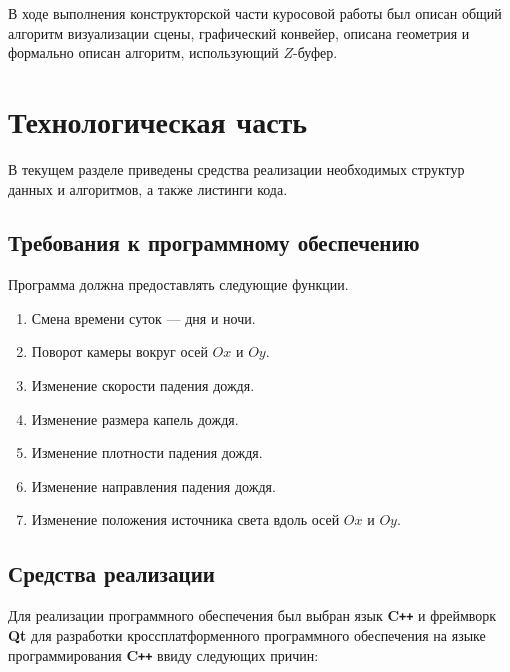 В ходе выполнения конструкторской части куросовой работы был описан общий алгоритм визуализации сцены, графический конвейер, описана геометрия и формально описан алгоритм, использующий $Z$-буфер.

\chapter{Технологическая часть}

В текущем разделе приведены средства реализации необходимых структур данных и алгоритмов, а также листинги кода.

\section{Требования к программному обеспечению}

Программа должна предоставлять следующие функции.
\begin{enumerate}
\item
Смена времени суток --- дня и ночи.
\item
Поворот камеры вокруг осей $Ox$ и $Oy$.
\item
Изменение скорости падения дождя.
\item
Изменение размера капель дождя.
\item
Изменение плотности падения дождя.
\item
Изменение направления падения дождя.
\item
Изменение положения источника света вдоль осей $Ox$ и $Oy$.
\end{enumerate}

\section{Средства реализации}

Для реализации программного обеспечения был выбран язык \textbf{C\texttt{++}} и фреймворк \textbf{Qt} для разработки кроссплатформенного программного обеспечения на языке программирования \textbf{C\texttt{++}} ввиду следующих причин:

